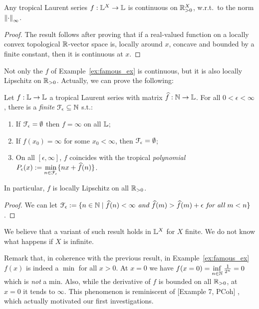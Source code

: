 \begin{theorem}\label{thm:cont}
 Any tropical Laurent series $f:\mathbb{L}^X\to\mathbb{L}$ is continuous on $\mathbb{R}_{>0}^X$, w.r.t.\ to the norm $\left\lVert\cdot\right\rVert_\infty$.
\end{theorem}
\begin{proof}
 The result follows after proving that if a real-valued function on a locally convex topological $\mathbb{R}$-vector space is, locally around $x$, concave and bounded by a finite constant, then it is continuous at $x$.
\end{proof}

Not only the $f$ of Example~\ref{ex:famous_ex} is continuous, but it is also locally Lipschitz on $\mathbb{R}_{>0}$.
Actually, we can prove the following:

\begin{theorem}\label{theorem:fepsilon}
 Let $f:\mathbb{L}\to\mathbb{L}$ a tropical Laurent series with matrix $\widehat f:\mathbb{N}\to\mathbb{L}$.
 For all $0<\epsilon<\infty$, there is a \emph{finite} $\mathcal{F}_\epsilon \subseteq \mathbb{N}$ s.t.:
 \begin{enumerate}
  \item If $\mathcal{F}_\epsilon=\emptyset$ then $f=\infty$ on all $\mathbb{L}$;
  \item If $f(x_0)=\infty$ for some $x_0<\infty$, then $\mathcal{F}_\epsilon=\emptyset$;
  \item On all $[\epsilon,\infty]$, $f$ coincides with the tropical \emph{polynomial} $P_\epsilon(x):=\min\limits_{n\in \mathcal{F}_\epsilon}\{nx+\widehat f(n)\}$.
 \end{enumerate}
 In particular, $f$ is locally Lipschitz on all $\mathbb{R}_{>0}$.
\end{theorem}
\begin{proof}
 We can let $\mathcal{F}_\epsilon:=\{n\in\mathbb{N} \mid
 \widehat f(n)<\infty \textit{ and } \widehat f(m)> \widehat f(m)+\epsilon \textit{ for all } m<n\}$.
\end{proof}

We believe that a variant of such result holds in $\mathbb{L}^X$ for $X$ finite.
We do not know what happens if $X$ is infinite.

Remark that, in coherence with the previous result, in Example~\ref{ex:famous_ex} $f(x)$ is indeed a $\min$ for all $x>0$.
At $x=0$ we have $f(x=0)=\inf\limits_{n\in\mathbb{N}} \frac{1}{2^n}=0$ which is \emph{not} a min.
Also, while the derivative of $f$ is bounded on all $\mathbb{R}_{>0}$, at $x=0$ it tends to $\infty$.
This phenomenon is reminiscent of [Example 7, PCoh]
, which actually motivated our first investigations.




